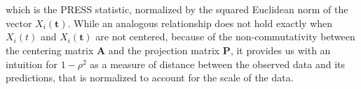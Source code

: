 which is the PRESS statistic, normalized by the squared Euclidean norm of the vector $X_i(\mathbf{t})$.
While an analogous relationship does not hold exactly when $X_i(t)$ and $\widehat{X}_i(\mathbf{t})$ are not centered, because of the non-commutativity between the centering matrix $\mathbf{A}$ and the projection matrix $\mathbf{P}$, it provides us with an intuition for $1-\rho^2$ as a measure of distance between the observed data and its predictions, that is normalized to account for the scale of the data.

